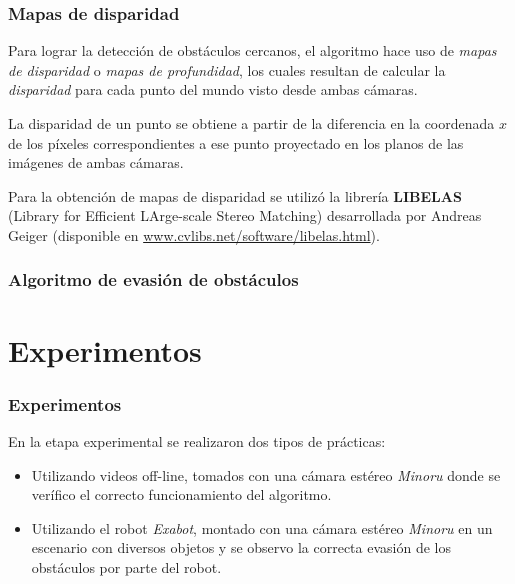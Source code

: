 \documentclass[svgnames]{beamer}
\begin{document}
\begin{frame}
\frametitle{Mapas de disparidad}

Para lograr la detecci\'on de obst\'aculos cercanos, el algoritmo hace uso de \emph{mapas de disparidad} o \emph{mapas de profundidad}, los cuales resultan de calcular la \emph{disparidad} para cada punto del mundo visto desde ambas c\'amaras.

La disparidad de un punto se obtiene a partir de la diferencia en la coordenada $x$ de los p\'ixeles correspondientes a ese punto proyectado en los planos de las im\'agenes de ambas c\'amaras.

Para la obtenci\'on de mapas de disparidad se utiliz\'o la librer\'ia {\bf LIBELAS} (Library for Efficient LArge-scale Stereo Matching) desarrollada por Andreas Geiger (disponible en \url{www.cvlibs.net/software/libelas.html}).

\end{frame}



%
%

\begin{frame}
\frametitle{Algoritmo de evasi\'on de obst\'aculos}


\end{frame}

\section{Experimentos}

\begin{frame}
\frametitle{Experimentos}
En la etapa experimental se realizaron dos tipos de pr\'acticas:
\begin{itemize}

	\item Utilizando videos off-line, tomados con una c\'amara est\'ereo \emph{Minoru} donde se ver\'ifico el correcto funcionamiento del algoritmo.
	
	\item Utilizando el robot \emph{Exabot}, montado con una c\'amara est\'ereo \emph{Minoru} en un escenario con diversos objetos y se observo la correcta evasi\'on de los obst\'aculos por parte del robot.
\end{itemize}



\end{frame}
\end{document}

